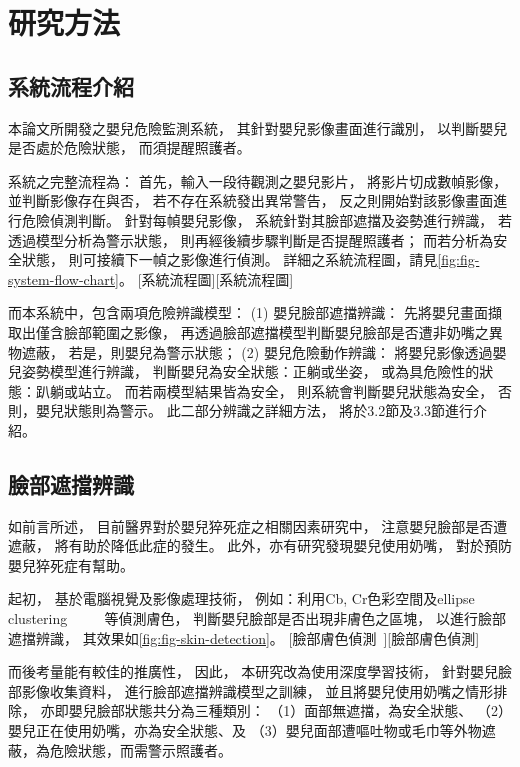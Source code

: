 \documentclass[class=NCU_thesis, crop=false]{standalone}
\begin{document}
\chapter{研究方法}

\section{系統流程介紹}
本論文所開發之嬰兒危險監測系統，
其針對嬰兒影像畫面進行識別，
以判斷嬰兒是否處於危險狀態，
而須提醒照護者。

系統之完整流程為：
首先，輸入一段待觀測之嬰兒影片，
將影片切成數幀影像，
並判斷影像存在與否，
若不存在系統發出異常警告，
反之則開始對該影像畫面進行危險偵測判斷。
針對每幀嬰兒影像，
系統針對其臉部遮擋及姿勢進行辨識，
若透過模型分析為警示狀態，
則再經後續步驟判斷是否提醒照護者；
而若分析為安全狀態，
則可接續下一幀之影像進行偵測。
詳細之系統流程圖，請見\cref{fig:fig-system-flow-chart}。
[系統流程圖][系統流程圖]

而本系統中，包含兩項危險辨識模型：
(1) 嬰兒臉部遮擋辨識：
先將嬰兒畫面擷取出僅含臉部範圍之影像，
再透過臉部遮擋模型判斷嬰兒臉部是否遭非奶嘴之異物遮蔽，
若是，則嬰兒為警示狀態；
(2) 嬰兒危險動作辨識：
將嬰兒影像透過嬰兒姿勢模型進行辨識，
判斷嬰兒為安全狀態：正躺或坐姿，
或為具危險性的狀態：趴躺或站立。
而若兩模型結果皆為安全，
則系統會判斷嬰兒狀態為安全，
否則，嬰兒狀態則為警示。
此二部分辨識之詳細方法，
將於3.2節及3.3節進行介紹。

\section{臉部遮擋辨識}
如前言所述，
目前醫界對於嬰兒猝死症之相關因素研究中，
注意嬰兒臉部是否遭遮蔽，
將有助於降低此症的發生。
此外，亦有研究發現嬰兒使用奶嘴，
對於預防嬰兒猝死症有幫助。

起初，
基於電腦視覺及影像處理技術，
例如：利用Cb, Cr色彩空間及ellipse clustering
~\cite{tang_hands_2008}~\cite{li_face_2011}~\cite{noauthor_python_nodate}~\cite{walkonnet_python_nodate}
等偵測膚色，
判斷嬰兒臉部是否出現非膚色之區塊，
以進行臉部遮擋辨識，
其效果如\cref{fig:fig-skin-detection}。
[臉部膚色偵測~\cite{walkonnet_python_nodate}][臉部膚色偵測]

而後考量能有較佳的推廣性，
因此，
本研究改為使用深度學習技術，
針對嬰兒臉部影像收集資料，
進行臉部遮擋辨識模型之訓練，
並且將嬰兒使用奶嘴之情形排除，
亦即嬰兒臉部狀態共分為三種類別：
（1）面部無遮擋，為安全狀態、
（2）嬰兒正在使用奶嘴，亦為安全狀態、及
（3）嬰兒面部遭嘔吐物或毛巾等外物遮蔽，為危險狀態，而需警示照護者。
\end{document}
